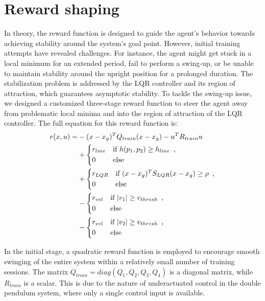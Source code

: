 \section{Reward shaping}
In theory, the reward function is designed to guide the agent's behavior towards achieving stability around the system's goal point. However, initial training attempts have revealed challenges. For instance, the agent might get stuck in a local minimum for an extended period, fail to perform a swing-up, or be unable to maintain stability around the upright position for a prolonged duration. The stabilization problem is addressed by the LQR controller and its region of attraction, which guarantees asymptotic stability. To tackle the swing-up issue, we designed a customized three-stage reward function to steer the agent away from problematic local minima and into the region of attraction of the LQR controller. The full equation for this reward function is:
\begin{equation}
\begin{aligned}
 r(x,u) = &-(x - x_g)^T Q_{train} (x - x_g) - u^T R_{train}u \\
           & +
            \begin{dcases*}
              r_{line} & \text{if} $h(p_1, p_2) \geq h_{line}$\, ,\\
              0 & \text{else}
            \end{dcases*}\\
           & +
            \begin{dcases*}
              r_{LQR} & \text{if} $(x - x_g)^T S_{LQR} (x - x_g) \geq \rho $\, ,\\
              0 & \text{else}
            \end{dcases*}\\
           & -
            \begin{dcases*}
              r_{vel} & \text{if} $|v_1| \geq v_{thresh}$\, ,\\
              0 & \text{else}
            \end{dcases*}\\
           & -
            \begin{dcases*}
              r_{vel} & \text{if} $|v_2| \geq v_{thresh}$\, ,\\
              0 & \text{else}
            \end{dcases*}
\end{aligned}
\end{equation}

In the initial stage, a quadratic reward function is employed to encourage
smooth swinging of the entire system within a relatively small number of
training sessions. The matrix  \(Q_{train} = diag(Q_1, Q_2, Q_3, Q_4)\) is a
diagonal matrix, while \(R_{train}\) is a scalar. This is due to the nature
of underactuated control in the double pendulum system, where only a single
control input is available.

